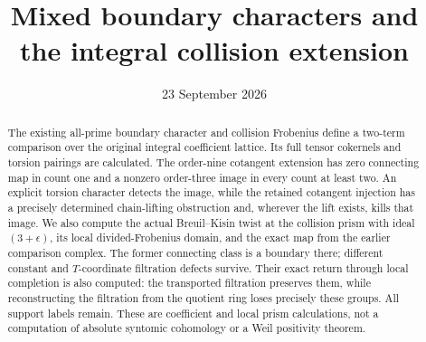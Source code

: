 \documentclass[11pt,a4paper]{article}
\title{Mixed boundary characters and the integral collision extension}
\author{}
\date{23 September 2026}
\begin{document}
\maketitle
\begin{abstract}
The existing all-prime boundary character and collision Frobenius
define a two-term comparison over the original integral coefficient
lattice. Its full tensor cokernels and torsion pairings are calculated.
The order-nine cotangent extension has zero connecting map in count
one and a nonzero order-three image in every count at least two.
An explicit torsion character detects the image, while the retained
cotangent injection has a precisely determined chain-lifting
obstruction and, wherever the lift exists, kills that image.
We also compute the actual Breuil--Kisin twist at the collision
prism with ideal \((3+\epsilon)\), its local divided-Frobenius
domain, and the exact map from the earlier comparison complex.
The former connecting class is a boundary there; different
constant and \(T\)-coordinate filtration defects survive.
Their exact return through local completion is also computed:
the transported filtration preserves them, while reconstructing
the filtration from the quotient ring loses precisely these groups.
All support labels remain. These are coefficient and local
prism calculations, not a computation of absolute syntomic
cohomology or a Weil positivity theorem.
\end{abstract}

\end{document}
